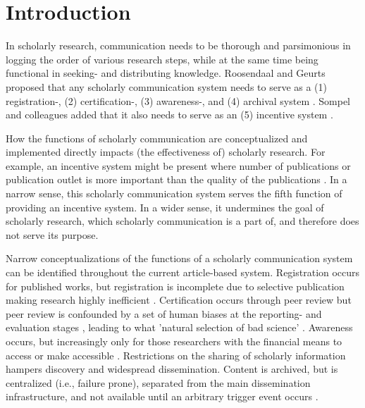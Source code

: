\documentclass[publications,article,submit,moreauthors,pdftex,10pt,a4paper]{Definitions/mdpi}
\begin{document}

\section*{Introduction}

In scholarly research, communication needs to be thorough and
parsimonious in logging the order of various research steps, while at
the same time being functional in seeking- and distributing knowledge.
Roosendaal and Geurts proposed that any scholarly communication system
needs to serve as a (1) registration-, (2) certification-, (3)
awareness-, and (4) archival system \citep{roosendaal1998}. Sompel
and colleagues added that it also needs to serve as an (5) incentive
system \citep{doi:10.1045/september2004-vandesompel}.

How the functions of scholarly communication are conceptualized and
implemented directly impacts (the effectiveness of) scholarly research.
For example, an incentive system might be present where number of
publications or publication outlet is more important than the quality
of the publications \citep{doi:10.3389/fnhum.2018.00037}. In a narrow
sense, this scholarly communication system serves the fifth function
of providing an incentive system. In a wider sense, it undermines the
goal of scholarly research, which scholarly communication is a part
of, and therefore does not serve its purpose.

Narrow conceptualizations of the functions of a scholarly
communication system can be identified throughout the current
article-based system.  Registration occurs for published works, but
registration is incomplete due to selective publication \citep[e.g., 1
  out of 2 registered clinical trials gets
  published;][]{doi:10.1016/0140-6736_91_90201-y} making research
highly inefficient
\citep{doi:10.1371/journal.pone.0084896}. Certification occurs through
peer review \citep{doi:10.1038/nature05008} but peer review is
confounded by a set of human biases at the reporting- and evaluation
stages \citep[e.g., methods are evaluated as of higher quality when
  they result in statistically significant results than when in
  statistically nonsignificant results;][]{doi:10.1007/bf01173636},
leading to what 'natural selection of bad science'
\citep{doi:10.1098/rsos.160384}. Awareness occurs, but increasingly
only for those researchers with the financial means to access or make
accessible \citep{doi:10.18352/lq.10280}. Restrictions on the sharing
of scholarly information hampers discovery and widespread
dissemination. Content is archived, but is centralized (i.e., failure
prone), separated from the main dissemination infrastructure, and not
available until an arbitrary trigger event occurs \citep[i.e., a dark
  archive;][]{doi:10.1629/uksg.215}.
\end{document}
